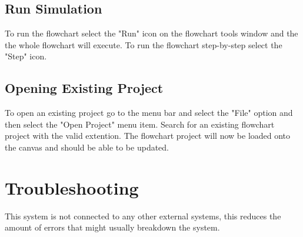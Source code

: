 \documentclass[11pt,a4paper,titlepage]{article}
\begin{document}
	\subsection{Run Simulation}
	To run the flowchart select the "Run" icon on the flowchart tools window and the the whole flowchart will execute. To run the flowchart step-by-step select the "Step" icon.
	
		
	\subsection{Opening Existing Project}
	
	To open an existing project go to the menu bar and select the "File" option and then select the "Open Project" menu item. Search for an existing flowchart project with the valid extention. The flowchart project will now be loaded onto the canvas and should be able to be updated.
	
\section{Troubleshooting}

This system is not connected to any other external systems, this reduces the amount of errors that might usually breakdown the system.
\end{document}

